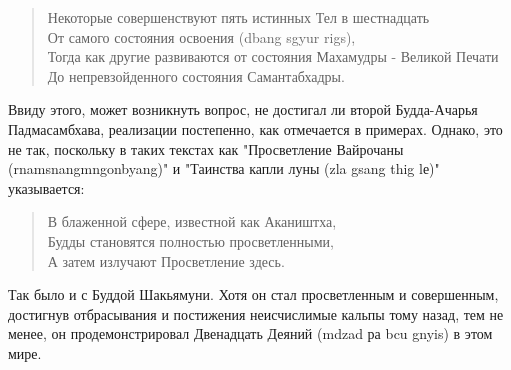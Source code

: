 \begin{verse}
Некоторые совершенствуют пять истинных Тел в шестнадцать\\
От самого состояния освоения (dbang sgyur rigs),\\
Тогда как другие развиваются от состояния Махамудры - Великой Печати\\
До непревзойденного состояния Самантабхадры.
\end{verse}

Ввиду этого, может возникнуть вопрос, не достигал ли второй Будда-Ачарья
Падмасамбхава, реализации постепенно, как отмечается в примерах. Однако, это не так,
поскольку в таких текстах как "Просветление Вайрочаны (rnamsnangmngonbyang)" и
"Таинства капли луны (zla gsang thig lе)" указывается:
\begin{verse}
В блаженной сфере, известной как Акаништха,\\
Будды становятся полностью просветленными,\\
А затем излучают Просветление здесь.
\end{verse}
Так было и с Буддой Шакьямуни. Хотя он стал просветленным и совершенным,
достигнув отбрасывания и постижения неисчислимые кальпы тому назад, тем не менее, он
продемонстрировал Двенадцать Деяний (mdzad ра bcu gnyis) в этом мире.\\

